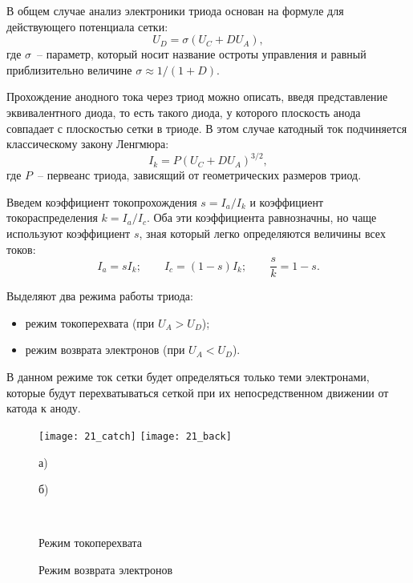 
В общем случае анализ электроники триода основан на формуле для действующего
потенциала сетки:
\begin{equation}
  U_D = \sigma (U_C + D U_A),
  \label{eq21el}
\end{equation}
где \( \sigma \)~-- параметр, который носит название остроты управления и
равный приблизительно величине \( \sigma \approx 1/(1 + D) \).

Прохождение анодного тока через триод можно описать, введя представление
эквивалентного диода, то есть такого диода, у которого плоскость анода
совпадает с плоскостью сетки в триоде. В этом случае катодный ток подчиняется
классическому закону Ленгмюра:
\begin{equation}
  I_k = P(U_C + DU_A)^{3/2},
  \label{eq211}
\end{equation}
где  \( P \)~-- первеанс триода, зависящий от геометрических
размеров триод.

Введем коэффициент токопрохождения \( s = I_a/I_k \) и коэффициент
токораспределения \( k = I_a/I_c \). Оба эти коэффициента равнозначны, но чаще
используют коэффициент \( s \), зная который легко определяются величины всех
токов:
\[
  I_a = s I_k; \qquad I_c = (1 - s) I_k; \qquad \frac{s}{k} = 1 - s.
\]

Выделяют два режима работы триода:
\vspace{-.5em}
\begin{itemize}
  \itemsep -.5pt
  \item режим токоперехвата (при \( U_A > U_D \));
  \item режим возврата электронов (при \( U_A < U_D \)).
\end{itemize}


В данном режиме ток сетки будет определяться только теми электронами, которые
будут перехватываться сеткой при их непосредственном движении от катода к аноду.

\begin{figure}[h!]
  \center
  \texttt{[image: 21\_catch]} \hspace{1em}
  \texttt{[image: 21\_back]} \\
  \vspace{-1em}\parbox{1em}{\small а)}\hspace{7.5em}\parbox{1em}{\small б)}
  \hspace{.4\textwidth}\hphantom{0} \\
  \parbox{.4\textwidth}{\caption{Режим токоперехвата} \label{pic21CC}}
  \hspace{1em}
  \parbox{.4\textwidth}{\caption{Режим возврата электронов} \label{pic21EB}}
\end{figure}

